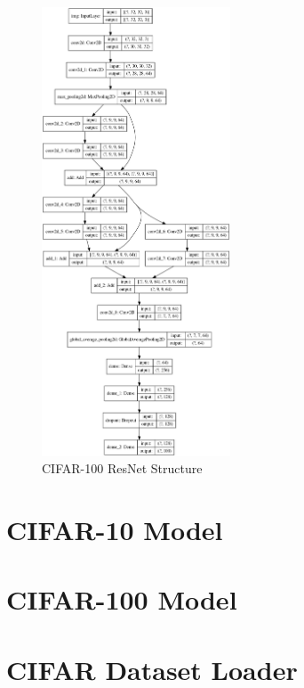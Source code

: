 \documentclass[]{article}
\begin{document}
\begin{figure}[H]
    \centering
    \includegraphics[width=0.5\textwidth]{cifar100_model.png}
    \caption{CIFAR-100 ResNet Structure}
\end{figure}

\newpage
\onecolumn


\newpage
\section{CIFAR-10 Model}

\newpage
\section{CIFAR-100 Model}

\newpage
\section{CIFAR Dataset Loader}

\end{document}
